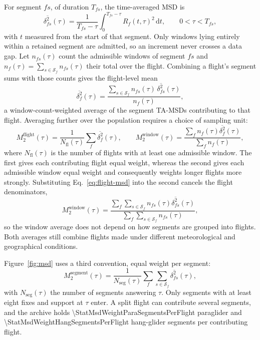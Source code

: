 For segment $fs$, of duration $T_{fs}$, the time-averaged MSD is
\begin{equation}
  \overline{\delta_{fs}^2}(\tau)
    =\frac{1}{T_{fs}-\tau}\int_0^{T_{fs}-\tau}R_f(t,\tau)^2\,\mathrm dt,
  \qquad 0<\tau<T_{fs},
  \label{eq:ta-msd}
\end{equation}
with $t$ measured from the start of that segment.
Only windows lying entirely within a retained segment are admitted, so an increment never
crosses a data gap. Let $n_{fs}(\tau)$ count the admissible windows of segment $fs$ and
$n_f(\tau)=\sum_{s\in\mathcal S_f}n_{fs}(\tau)$ their total over the flight. Combining a
flight's segment sums with those counts gives the flight-level mean
\begin{equation}
  \overline{\delta_f^2}(\tau)
   =\frac{\sum_{s\in\mathcal S_f}n_{fs}(\tau)\,\overline{\delta_{fs}^2}(\tau)}{n_f(\tau)},
  \label{eq:flight-msd}
\end{equation}
a window-count-weighted average of the segment TA-MSDs contributing to that flight.
Averaging further over the population requires a choice of sampling unit:
\begin{equation}
  M_2^{\mathrm{flight}}(\tau)
   =\frac{1}{N_{\mathrm{fl}}(\tau)}\sum_f\overline{\delta_f^2}(\tau),
  \qquad
  M_2^{\mathrm{window}}(\tau)
   =\frac{\sum_f n_f(\tau)\overline{\delta_f^2}(\tau)}{\sum_f n_f(\tau)},
  \label{eq:weights-global}
\end{equation}
where $N_{\mathrm{fl}}(\tau)$ is the number of flights with at least one admissible window.
The first gives each contributing flight equal weight, whereas the second gives each
admissible window equal weight and consequently weights longer flights more strongly.
Substituting Eq.~\eqref{eq:flight-msd} into the second cancels the flight denominators,
\begin{equation}
 M_2^{\mathrm{window}}(\tau)
  =\frac{\sum_f\sum_{s\in\mathcal S_f}n_{fs}(\tau)\overline{\delta_{fs}^2}(\tau)}
        {\sum_f\sum_{s\in\mathcal S_f}n_{fs}(\tau)},
 \label{eq:window-segments}
\end{equation}
so the window average does not depend on how segments are grouped into flights.
Both averages still combine flights made under different meteorological and geographical
conditions.

Figure~\ref{fig:msd} uses a third convention, equal weight per segment:
\begin{equation}
 M_2^{\mathrm{segment}}(\tau)=\frac1{N_{\mathrm{seg}}(\tau)}
 \sum_f\sum_{s\in\mathcal S_f}\overline{\delta_{fs}^2}(\tau),
 \label{eq:segment-msd}
\end{equation}
with $N_{\mathrm{seg}}(\tau)$ the number of segments answering $\tau$.
Only segments with at least eight fixes and support at $\tau$ enter. A split flight
can contribute several segments, and the archive holds
\num{\StatMsdWeightParaSegmentsPerFlight} paraglider and
\num{\StatMsdWeightHangSegmentsPerFlight} hang-glider segments per contributing flight.

